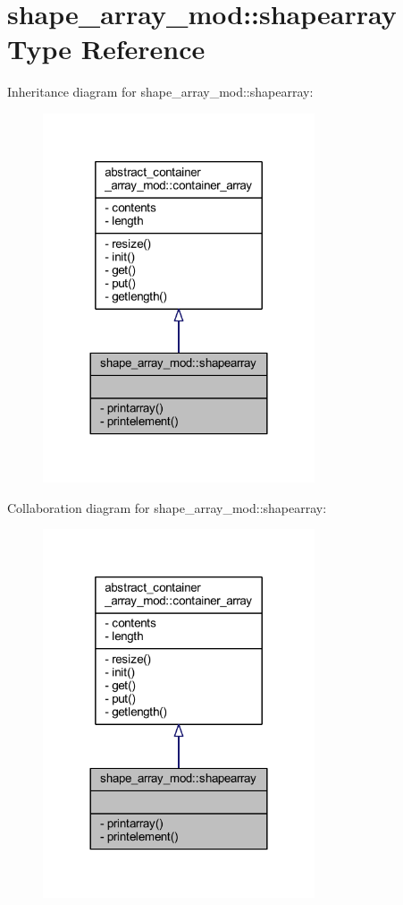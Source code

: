 \hypertarget{structshape__array__mod_1_1shapearray}{}\section{shape\+\_\+array\+\_\+mod\+:\+:shapearray Type Reference}
\label{structshape__array__mod_1_1shapearray}


Inheritance diagram for shape\+\_\+array\+\_\+mod\+:\+:shapearray\+:
\nopagebreak
\begin{figure}[H]
\begin{center}
\leavevmode
\includegraphics[width=228pt]{structshape__array__mod_1_1shapearray__inherit__graph}
\end{center}
\end{figure}


Collaboration diagram for shape\+\_\+array\+\_\+mod\+:\+:shapearray\+:
\nopagebreak
\begin{figure}[H]
\begin{center}
\leavevmode
\includegraphics[width=228pt]{structshape__array__mod_1_1shapearray__coll__graph}
\end{center}
\end{figure}
